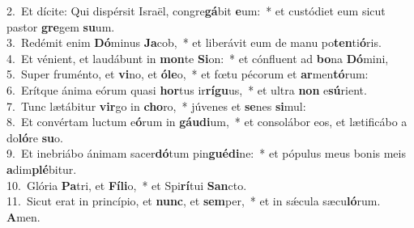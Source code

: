 {2.~}Et dícite: Qui dispérsit Israël, congre\textbf{gá}bit \textbf{e}um:~* et custódiet eum sicut pastor \textbf{gre}gem \textbf{su}um.\\
{3.~}Redémit enim \textbf{Dó}minus \textbf{Ja}cob,~* et liberávit eum de manu po\textbf{ten}ti\textbf{ó}ris.\\
{4.~}Et vénient, et laudábunt in \textbf{mon}te \textbf{Si}on:~* et cónfluent ad \textbf{bo}na \textbf{Dó}mini,\\
{5.~}Super fruménto, et \textbf{vi}no, et \textbf{ó}\textbf{le}o,~* et fœtu pécorum et \textbf{ar}men\textbf{tó}rum:\\
{6.~}Erítque ánima eórum quasi \textbf{hor}tus ir\textbf{rí}\textbf{gu}us,~* et ultra \textbf{non} e\textbf{sú}rient.\\
{7.~}Tunc lætábitur \textbf{vir}go in \textbf{cho}ro,~* júvenes et \textbf{se}nes \textbf{si}mul:\\
{8.~}Et convértam luctum e\textbf{ó}rum in \textbf{gáu}\textbf{di}um,~* et consolábor eos, et lætificábo a do\textbf{ló}re \textbf{su}o.\\
{9.~}Et inebriábo ánimam sacer\textbf{dó}tum pin\textbf{gué}\textbf{di}ne:~* et pópulus meus bonis meis \textbf{a}dim\textbf{plé}bitur.\\
{10.~}Glória \textbf{Pa}tri, et \textbf{Fí}\textbf{li}o,~* et Spi\textbf{rí}tui \textbf{San}cto.\\
{11.~}Sicut erat in princípio, et \textbf{nunc}, et \textbf{sem}per,~* et in sǽcula sæcu\textbf{ló}rum. \textbf{A}men.\\
